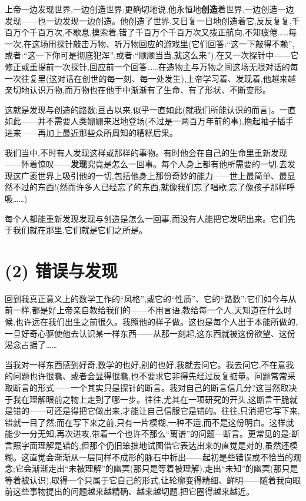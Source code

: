 \asterisms

 上帝一边发现世界,一边创造世界;更确切地说,他永恒地\textbf{创造}着世界,一边创造一边发现——也一边发现一边创造。他创造了世界,又日复一日地创造着它,反反复复,千百万个千百万次,不歇息,摸索着,错了千百万个千百万次又拨正航向,不知疲倦……每一次,在这场用探针敲击万物、听万物回应的游戏里(它们回答:“这一下敲得不赖”,或者:“这一下你可是彻底犯浑”,或者:“顺顺当当,就这么来”),在又一次探针中——它修正或重提前一次探针,回应前一个回答……在造物主与万物之间这场无限对话的每一次往复里(这对话在创世的每一刻、每一处发生),上帝学习着、发现着,他越来越亲切地认识万物,而万物也在他手中渐渐有了生命、有了形状、不断变形。

这就是发现与创造的路数;亘古以来,似乎一直如此(就我们所能认识的而言)。一直如此——并不需要人类姗姗来迟地登场(不过是一两百万年前的事),撸起袖子插手进来——再加上最近那些众所周知的糟糕后果。

我们当中,不时有人发现这样或那样的事物。有时他会在自己的生命里重新发现——怀着惊叹——\textbf{发现}究竟是怎么一回事。每个人身上都有他所需要的一切,去发现这广袤世界上吸引他的一切,包括他身上那份奇妙的能力——世上最简单、最显然不过的东西!(然而许多人已经忘了的东西,就像我们忘了唱歌,忘了像孩子那样呼吸……)

每个人都能重新发现发现与创造是怎么一回事,而没有人能把它发明出来。它们先于我们就在那里,它们就是它们之所是。

\section{(2) 错误与发现}

回到我真正意义上的数学工作的“风格”,或它的“性质”、它的“路数”:它们如今与从前一样,都是好上帝亲自教给我们的——不用言语,教给每一个人,天知道在什么时候,也许远在我们出生之前很久。我照他的样子做。这也是每个人出于本能所做的,一旦好奇心驱使他去认识某一样东西——从那一刻起,这东西就被这份欲望、这份渴念占据了……

 当我对一样东西感到好奇,数学的也好,别的也好,我就去问它。我去问它,不在意我的问题也许很蠢、或者会显得很蠢,也不要求它非得先经过反复掂量。问题常常采取断言的形式——一个其实只是探针的断言。我对自己的断言信几分?这当然取决于我在理解眼前之物上走到了哪一步。往往,尤其在一项研究的开头,这断言干脆就是错的——可还是得把它做出来,才能让自己信服它是错的。往往,只消把它写下来,
错就一目了然;而在写下来之前,只有一片模糊,一种不适,而不是这份明白。这样就能少一分无知,再次进攻,带着一个也许不那么“离谱”的问题—断言。更常见的是:断言照字面理解是错的,但那个仍旧笨拙地试图借它表达出来的直觉是对的,虽然还模糊。这直觉会渐渐从一层同样不成形的脉石中析出——起初是些错误或不恰当的观念;它会渐渐走出“未被理解”的幽冥(那只是等着被理解),走出“未知”的幽冥(那只是等着被认识),取得一个只属于它自己的形式,让轮廓变得精细、鲜明——随着我向眼前这些事物提出的问题越来越精确、越来越切题,把它圈得越来越近。


